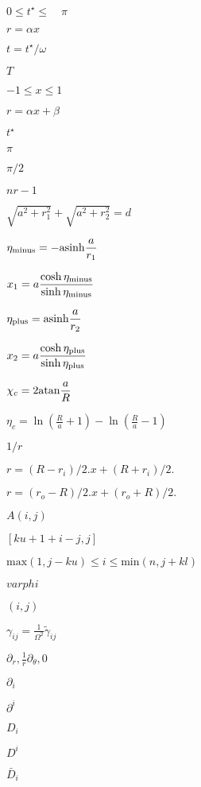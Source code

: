 \documentclass{article}
\begin{document}
$ 0 \leq t^\star \leq \quad \pi$
\pagebreak

$ r = \alpha x $
\pagebreak

$ t = t^\star / \omega$
\pagebreak

$T$
\pagebreak

$ -1 \leq x \leq 1 $
\pagebreak

$ r = \alpha x + \beta$
\pagebreak

$ t^\star$
\pagebreak

$ \pi$
\pagebreak

$\pi/2$
\pagebreak

$ nr-1 $
\pagebreak

$ \sqrt{a^2 + r_1^2} + \sqrt{a^2 + r_2^2} = d $
\pagebreak

$ \eta_{\rm minus} = -{\rm asinh}\displaystyle\frac{a}{r_1}$
\pagebreak

$ x_1 = a \displaystyle\frac{\cosh \eta_{\rm minus}}{\sinh \eta_{\rm minus}} $
\pagebreak

$ \eta_{\rm plus} = {\rm asinh}\displaystyle\frac{a}{r_2}$
\pagebreak

$ x_2 = a \displaystyle\frac{\cosh \eta_{\rm plus}}{\sinh \eta_{\rm plus}} $
\pagebreak

$ \chi_c = 2 {\rm atan}\displaystyle\frac{a}{R} $
\pagebreak

$ \eta_c = \ln (\displaystyle\frac{R}{a} + 1) - \ln (\displaystyle\frac{R}{a} - 1) $
\pagebreak

$ 1/r$
\pagebreak

$ r = (R - r_i)/2. x + (R + r_i)/2. $
\pagebreak

$ r = (r_o - R)/2. x + (r_o + R)/2. $
\pagebreak

$ A(i, j)$
\pagebreak

$[ku+1+i-j, j]$
\pagebreak

$\mathrm {max}(1, j-ku) \leq i \leq \mathrm{min} (n, j+kl)$
\pagebreak

$varphi$
\pagebreak

$ (i,j) $
\pagebreak

$\gamma_{ij} = \frac{1}{\Omega^2}\tilde{\gamma}_{ij}$
\pagebreak

$ \partial_r, \frac{1}{r}\partial_\theta, 0$
\pagebreak

$\partial_i$
\pagebreak

$\partial^i$
\pagebreak

$D_i$
\pagebreak

$D^i$
\pagebreak

$\bar{D}_i$
\pagebreak
\end{document}
